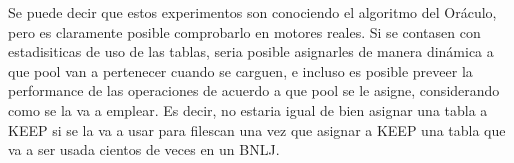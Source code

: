 Se puede decir que estos experimentos son conociendo el algoritmo del Or\'aculo,
pero es claramente posible comprobarlo en motores reales. Si se contasen
con estadisiticas de uso de las tablas, seria posible asignarles de manera
din\'amica a que pool van a pertenecer cuando se carguen, e incluso es
posible preveer la performance de las operaciones de acuerdo a que pool
se le asigne, considerando como se la va a emplear. Es decir, no estaria
igual de bien asignar una tabla a KEEP si se la va a usar para filescan
una vez que asignar a KEEP una tabla que va a ser usada cientos de veces
en un BNLJ.
